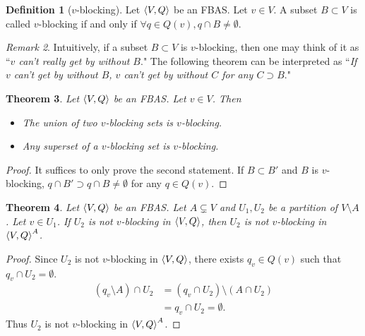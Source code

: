 \documentclass[12pt, psamsfonts]{amsart}
\newtheorem{thm}{Theorem}[subsection]
\theoremstyle{definition}
\newtheorem{defn}[thm]{Definition}
\theoremstyle{remark}
\newtheorem{rem}[thm]{Remark}
\numberwithin{equation}{subsection}
\begin{document}
\begin{defn}[$v$-blocking]\label{def_v_blocking}
    Let $\ev{V, Q}$ be an FBAS\@.
    Let $v \in V$.
    A subset $B \subset V$ is called $v$-blocking if and only if $\forall q \in Q(v), q \cap B \ne \emptyset$.
\end{defn}

\begin{rem}
    Intuitively, if a subset $B \subset V$ is $v$-blocking, then one may think of it as ``\textit{$v$ can't really get by without $B$}."
    The following theorem can be interpreted as ``\textit{If $v$ can't get by without $B$, $v$ can't get by without $C$ for any $C \supset B$}."
\end{rem}

\begin{thm}\label{basic_prop_v_blocking}
    Let $\ev{V, Q}$ be an FBAS\@.
    Let $v \in V$.
    Then
    \begin{itemize}
        \item
            The union of two $v$-blocking sets is $v$-blocking.
        \item
            Any superset of a $v$-blocking set is $v$-blocking.
    \end{itemize}
\end{thm}

\begin{proof}
    It suffices to only prove the second statement.
    If $B \subset B'$ and $B$ is $v$-blocking, $q \cap B' \supset q \cap B \ne \emptyset$ for any $q \in Q(v)$.
\end{proof}

\begin{thm}\label{v_blocking_delete}
    Let $\ev{V, Q}$ be an FBAS\@.
    Let $A \subsetneq V$ and $U_1, U_2$ be a partition of $V \setminus A$.
    Let $v \in U_1$.
    If $U_2$ is not $v$-blocking in $\ev{V, Q}$, then $U_2$ is not $v$-blocking in $\ev{V, Q}^A$.
\end{thm}

\begin{proof}
    Since $U_2$ is not $v$-blocking in $\ev{V, Q}$, there exists $q_v \in Q(v)$ such that $q_v \cap U_2 = \emptyset$.
    \begin{align*}
        (q_v \setminus A) \cap U_2
            &= (q_v \cap U_2) \setminus (A \cap U_2) \\
            &= q_v \cap U_2 = \emptyset.
    \end{align*}
    Thus $U_2$ is not $v$-blocking in $\ev{V, Q}^A$.
\end{proof}
\end{document}
